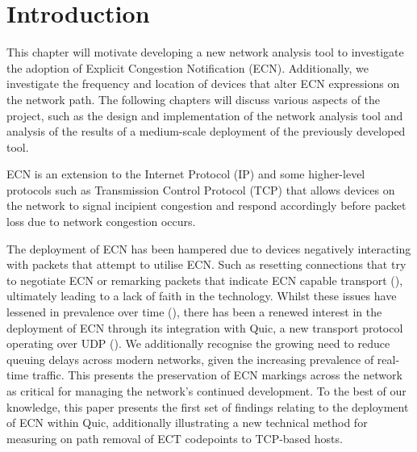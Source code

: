 \documentclass{l4proj}
\begin{document}
\chapter{Introduction}
\label{chap:introduction}


This chapter will motivate developing a new network analysis tool to investigate the adoption of Explicit Congestion Notification (ECN). Additionally, we investigate the frequency and location of devices that alter ECN expressions on the network path. The following chapters will discuss various aspects of the project, such as the design and implementation of the network analysis tool and analysis of the results of a medium-scale deployment of the previously developed tool.

ECN is an extension to the Internet Protocol (IP) and some higher-level protocols such as Transmission Control Protocol (TCP) that allows devices on the network to signal incipient congestion and respond accordingly before packet loss due to network congestion occurs.

The deployment of ECN has been hampered due to devices negatively interacting with packets that attempt to utilise ECN. Such as resetting connections that try to negotiate ECN or remarking packets that indicate ECN capable transport (\cite{floyd_inappropriate_2002}), ultimately leading to a lack of faith in the technology. Whilst these issues have lessened in prevalence over time (\cite{trammell_enabling_2015}), there has been a renewed interest in the deployment of ECN through its integration with Quic, a new transport protocol operating over UDP (\cite{johansson_ecn_2017}). We additionally recognise the growing need to reduce queuing delays across modern networks, given the increasing prevalence of real-time traffic. This presents the preservation of ECN markings across the network as critical for managing the network's continued development. To the best of our knowledge, this paper presents the first set of findings relating to the deployment of ECN within Quic, additionally illustrating a new technical method for measuring on path removal of ECT codepoints to TCP-based hosts.
\end{document}

